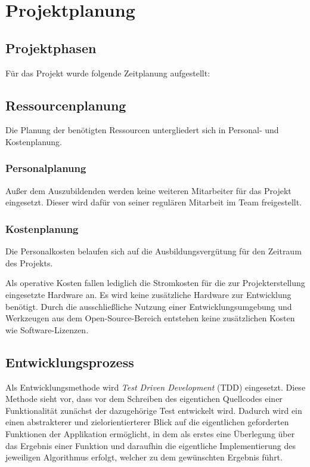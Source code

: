 \section{Projektplanung}
\label{sec:Projektplanung}


\subsection{Projektphasen}
\label{sec:Projektphasen}
Für das Projekt wurde folgende Zeitplanung aufgestellt:


\subsection{Ressourcenplanung}
\label{sec:Ressourcenplanung}
Die Planung der benötigten Ressourcen untergliedert sich in Personal- und Kostenplanung.
\subsubsection{Personalplanung}
\label{sec:Personalplanung}
Außer dem Auszubildenden werden keine weiteren Mitarbeiter für das Projekt eingesetzt. Dieser wird
dafür von seiner regulären Mitarbeit im Team freigestellt.
\subsubsection{Kostenplanung}
\label{sec:Kostenplanung}
Die Personalkosten belaufen sich auf die Ausbildungsvergütung für den Zeitraum des Projekts.

Als operative Kosten fallen lediglich die Stromkosten für die zur Projekterstellung eingesetzte
Hardware an. Es wird keine zusätzliche Hardware zur Entwicklung benötigt.
Durch die ausschließliche Nutzung einer Entwicklungsumgebung und Werkzeugen aus dem
Open-Source-Bereich entstehen keine zusätzlichen Kosten wie Software-Lizenzen.

\subsection{Entwicklungsprozess}
\label{sec:Entwicklungsprozess}
Als Entwicklungsmethode wird \textit{Test Driven Development} (\acs{TDD}) eingesetzt. Diese Methode
sieht vor, dass vor dem Schreiben des eigentichen Quellcodes einer Funktionalität zunächst der
dazugehörige Test entwickelt wird. Dadurch wird ein einen abstrakterer und
zielorientierterer Blick auf die eigentlichen geforderten Funktionen der Applikation ermöglicht, in
dem als erstes eine Überlegung über das Ergebnis einer Funktion und daraufhin die eigentliche Implementierung
des jeweiligen Algorithmus erfolgt, welcher zu dem gewünschten Ergebnis führt.

